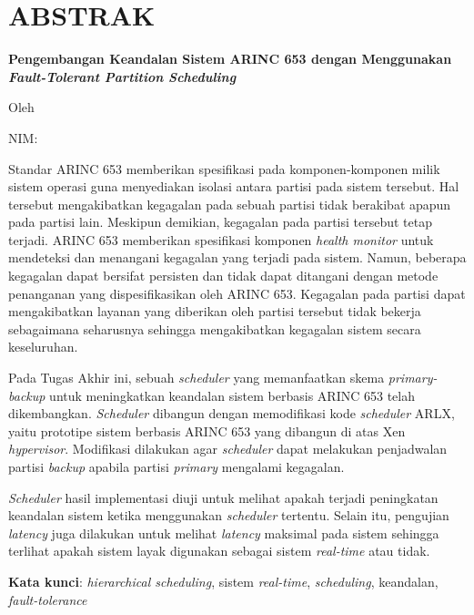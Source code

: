 \clearpage
\chapter*{ABSTRAK}

\begin{center}

	\large \bfseries
	Pengembangan Keandalan Sistem ARINC 653 dengan Menggunakan \textit{Fault-Tolerant Partition Scheduling}

	\normalsize \normalfont Oleh

	\large \penulis

	\large NIM: \nimpenulis

\end{center}

Standar ARINC 653 memberikan spesifikasi pada komponen-komponen milik sistem operasi guna
menyediakan isolasi antara partisi pada sistem tersebut. Hal tersebut mengakibatkan kegagalan
pada sebuah partisi tidak berakibat apapun pada partisi lain. Meskipun demikian, kegagalan pada
partisi tersebut tetap terjadi. ARINC 653 memberikan spesifikasi komponen \textit{health
monitor} untuk mendeteksi dan menangani kegagalan yang terjadi pada sistem. Namun, beberapa
kegagalan dapat bersifat persisten dan tidak dapat ditangani dengan metode penanganan yang
dispesifikasikan oleh ARINC 653.  Kegagalan pada partisi dapat mengakibatkan layanan yang
diberikan oleh partisi tersebut tidak bekerja sebagaimana seharusnya sehingga mengakibatkan
kegagalan sistem secara keseluruhan.

Pada Tugas Akhir ini, sebuah \textit{scheduler} yang memanfaatkan skema \textit{primary-backup}
untuk meningkatkan keandalan sistem berbasis ARINC 653 telah dikembangkan.  \textit{Scheduler}
dibangun dengan memodifikasi kode \textit{scheduler} ARLX, yaitu prototipe sistem berbasis ARINC
653 yang dibangun di atas Xen \textit{hypervisor}. Modifikasi dilakukan agar \textit{scheduler}
dapat melakukan penjadwalan partisi \textit{backup} apabila partisi \textit{primary} mengalami
kegagalan.

\textit{Scheduler} hasil implementasi diuji untuk melihat apakah terjadi peningkatan keandalan
sistem ketika menggunakan \textit{scheduler} tertentu. Selain itu, pengujian \textit{latency}
juga dilakukan untuk melihat \textit{latency} maksimal pada sistem sehingga terlihat apakah
sistem layak digunakan sebagai sistem \textit{real-time} atau tidak.

\textbf{Kata kunci}: \textit{hierarchical scheduling}, sistem \textit{real-time},
\textit{scheduling}, keandalan, \textit{fault-tolerance}

\clearpage

